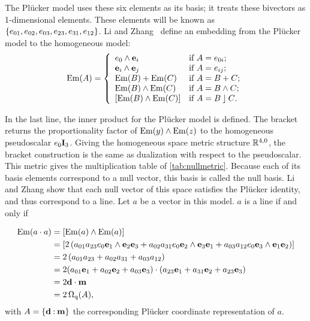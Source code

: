 The Pl\"ucker model uses these six elements as its basis; it treats these bivectors as 1-dimensional elements.  These elements will be known as $\{e_{01}, e_{02}, e_{03}, e_{23}, e_{31}, e_{12}\}$.  Li and Zhang~\cite{Hongbo} define an embedding from the Pl\"ucker model to the homogeneous model:
\begin{equation} \label{eq:Em}
  \operatorname{Em}(A) = \left\{ 
    \begin{array}{ll}
      e_0 \wedge \mathbf{e}_i &\mbox{if $A = e_{0i}$}; \\
      \mathbf{e}_i \wedge \mathbf{e}_j &\mbox{if $A = e_{ij}$}; \\
      \operatorname{Em}(B) + \operatorname{Em}(C) &\mbox{if $A = B + C$}; \\
      \operatorname{Em}(B) \wedge \operatorname{Em}(C) &\mbox{if $A = B \wedge C$}; \\
      \left[\operatorname{Em}(B) \wedge \operatorname{Em}(C)\right] &\mbox{if $A = B \mathbin{\rfloor} C$}. \\
    \end{array}
    \right.
\end{equation}

In the last line, the inner product for the Pl\"ucker model is defined.  The bracket returns the proportionality factor of $\operatorname{Em}(y) \wedge \operatorname{Em}(z)$ to the homogeneous pseudoscalar $e_0\mathbf{I}_3$.  Giving the homogeneous space metric structure $\mathbb{R}^{4,0}$, the bracket construction is the same as dualization with respect to the pseudoscalar.  This metric gives the multiplication table of \autoref{tab:nullmetric}.  Because each of its basis elements correspond to a null vector, this basis is called the null basis.  Li and Zhang show that each null vector of this space satisfies the Pl\"ucker identity, and thus correspond to a line.  Let $a$ be a vector in this model.  $a$ is a line if and only if

\begin{align*}
  \operatorname{Em}(a \mathbin{\cdot} a) &= \left[\operatorname{Em}(a) \wedge \operatorname{Em}(a)\right] \\
    &= \left[ 2 \left( a_{01} a_{23} e_0\mathbf{e}_1 \wedge \mathbf{e}_2\mathbf{e}_3 + a_{02} a_{31} e_0\mathbf{e}_2 \wedge \mathbf{e}_3\mathbf{e}_1 + a_{03} a_{12} e_0\mathbf{e}_3 \wedge \mathbf{e}_1\mathbf{e}_2 \right) \right] \\
    &= 2 \left( a_{01} a_{23} + a_{02} a_{31} + a_{03} a_{12} \right) \\
    &= 2 (a_{01} \mathbf{e}_1 + a_{02} \mathbf{e}_2 + a_{03} \mathbf{e}_3) \mathbin{\cdot} (a_{23} \mathbf{e}_1 + a_{31} \mathbf{e}_2 + a_{23} \mathbf{e}_3) \\
    &= 2 \mathbf{d} \mathbin{\cdot} \mathbf{m} \\ 
    &= 2 \operatorname{\Omega_q}(A),
\end{align*}
with $A = \{\mathbf{d} \mathbin{:} \mathbf{m}\}$ the corresponding Pl\"ucker coordinate representation of $a$.

